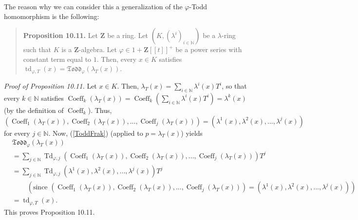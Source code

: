 \documentclass[numbers=enddot,12pt,final,onecolumn,notitlepage]{scrartcl}%
\begin{document}
The reason why we can consider this a generalization of the $\varphi$-Todd
homomorphism is the following:

\begin{quote}
\textbf{Proposition 10.11.} Let $\mathbf{Z}$ be a ring. Let $\left(  K,\left(
\lambda^{i}\right)  _{i\in\mathbb{N}}\right)  $ be a $\lambda$-ring such that
$K$ is a $\mathbf{Z}$-algebra. Let $\varphi\in1+\mathbf{Z}\left[  \left[
t\right]  \right]  ^{+}$ be a power series with constant term equal to $1$.
Then, every $x\in K$ satisfies $\operatorname*{td}_{\varphi,T}\left(
x\right)  =\mathfrak{Todd}_{\varphi}\left(  \lambda_{T}\left(  x\right)
\right)  $.
\end{quote}

\textit{Proof of Proposition 10.11.} Let $x\in K$. Then, $\lambda_{T}\left(
x\right)  =\sum\limits_{i\in\mathbb{N}}\lambda^{i}\left(  x\right)  T^{i}$, so
that every $k\in\mathbb{N}$ satisfies $\operatorname*{Coeff}\nolimits_{k}%
\left(  \lambda_{T}\left(  x\right)  \right)  =\operatorname*{Coeff}%
\nolimits_{k}\left(  \sum\limits_{i\in\mathbb{N}}\lambda^{i}\left(  x\right)
T^{i}\right)  =\lambda^{k}\left(  x\right)  $ (by the definition of
$\operatorname*{Coeff}\nolimits_{k}$). Thus, $\left(  \operatorname*{Coeff}%
\nolimits_{1}\left(  \lambda_{T}\left(  x\right)  \right)
,\operatorname*{Coeff}\nolimits_{2}\left(  \lambda_{T}\left(  x\right)
\right)  ,...,\operatorname*{Coeff}\nolimits_{j}\left(  \lambda_{T}\left(
x\right)  \right)  \right)  =\left(  \lambda^{1}\left(  x\right)  ,\lambda
^{2}\left(  x\right)  ,...,\lambda^{j}\left(  x\right)  \right)  $ for every
$j\in\mathbb{N}$. Now, (\ref{ToddFrak}) (applied to $p=\lambda_{T}\left(
x\right)  $) yields%
\begin{align*}
&  \mathfrak{Todd}_{\varphi}\left(  \lambda_{T}\left(  x\right)  \right) \\
&  =\sum\limits_{j\in\mathbb{N}}\operatorname*{Td}\nolimits_{\varphi,j}\left(
\operatorname*{Coeff}\nolimits_{1}\left(  \lambda_{T}\left(  x\right)
\right)  ,\operatorname*{Coeff}\nolimits_{2}\left(  \lambda_{T}\left(
x\right)  \right)  ,...,\operatorname*{Coeff}\nolimits_{j}\left(  \lambda
_{T}\left(  x\right)  \right)  \right)  T^{j}\\
&  =\sum\limits_{j\in\mathbb{N}}\operatorname*{Td}\nolimits_{\varphi,j}\left(
\lambda^{1}\left(  x\right)  ,\lambda^{2}\left(  x\right)  ,...,\lambda
^{j}\left(  x\right)  \right)  T^{j}\\
&  \ \ \ \ \ \ \ \ \ \ \left(  \text{since }\left(  \operatorname*{Coeff}%
\nolimits_{1}\left(  \lambda_{T}\left(  x\right)  \right)
,\operatorname*{Coeff}\nolimits_{2}\left(  \lambda_{T}\left(  x\right)
\right)  ,...,\operatorname*{Coeff}\nolimits_{j}\left(  \lambda_{T}\left(
x\right)  \right)  \right)  =\left(  \lambda^{1}\left(  x\right)  ,\lambda
^{2}\left(  x\right)  ,...,\lambda^{j}\left(  x\right)  \right)  \right) \\
&  =\operatorname*{td}\nolimits_{\varphi,T}\left(  x\right)  .
\end{align*}
This proves Proposition 10.11.
\end{document}
